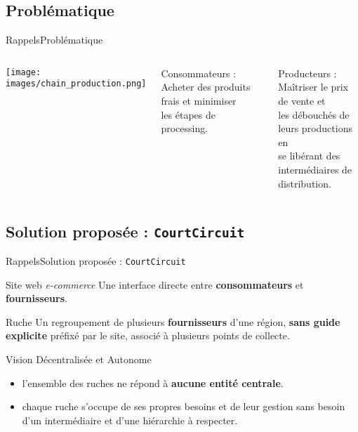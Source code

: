 \documentclass[usenames,dvipsnames]{beamer}
\begin{document}
\subsection{Problématique}
\begin{frame}{Rappels}{Problématique}
\begin{columns}[onlytextwidth, T]
  \column{50mm}
    \texttt{[image: images/chain\_production.png]}

  \column{\dimexpr\linewidth-35mm-4mm}
    \begin{block}{Consommateurs :}
    Acheter des produits frais et minimiser \\les étapes de processing.
    \end{block}

    \begin{block}{Producteurs :}
    Maîtriser le prix de vente et \\les débouchés de leurs productions en \\se libérant des intermédiaires de distribution.
    \end{block}
\end{columns}
\end{frame}
\subsection{Solution proposée : \texttt{CourtCircuit}}
\begin{frame}{Rappels}{Solution proposée : \texttt{CourtCircuit}}
  \begin{block}{Site web \textit{e-commerce}}
  Une interface directe entre \textbf{consommateurs} et \textbf{fournisseurs}.
  \end{block}

  \begin{block}{Ruche}
  Un regroupement de plusieurs \textbf{fournisseurs} d'une région, \textbf{sans guide explicite} préfixé par le site, associé à plusieurs points de collecte.
  \end{block}

  \begin{block}{Vision Décentralisée et Autonome}
  \begin{itemize}
    \item l'ensemble des ruches ne répond à \textbf{aucune entité centrale}.
    \item chaque ruche s'occupe de ses propres besoins et de leur gestion sans besoin d'un intermédiaire et d'une hiérarchie à respecter.
  \end{itemize}
  \end{block}
\end{frame}
\end{document}
